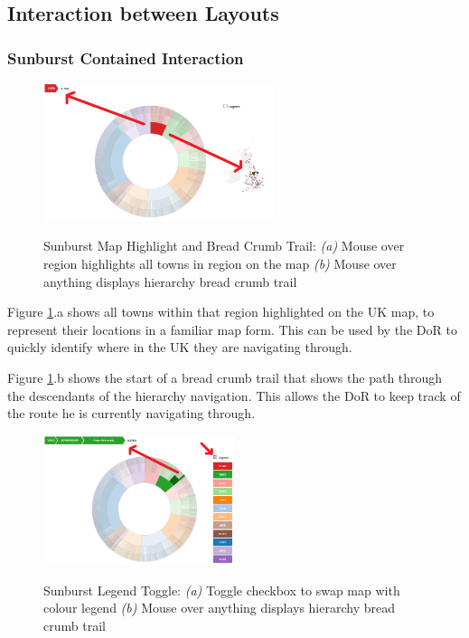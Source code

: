 \documentclass[a4paper, 11pt]{article}
\begin{document}
\newpage
\subsection{Interaction between Layouts}
\subsubsection{Sunburst Contained Interaction}
\begin{figure}[hbt!]
	\centering
      \includegraphics[width=0.6\textwidth]{imgs/sb_int/Region_select.png} \\
	\caption{Sunburst Map Highlight and Bread Crumb Trail: 
	\textit{(a)} Mouse over region highlights all towns in region on the map
	\textit{(b)} Mouse over anything displays hierarchy bread crumb trail}
	\label{fig:sb_con:reg_bread}
          \noindent\makebox[\linewidth]{\rule{\textwidth}{0.4pt}}
\end{figure}

\noindent Figure \ref{fig:sb_con:reg_bread}.a shows all towns within that region highlighted on the UK map, to represent their locations in a familiar map form. This can be used by the DoR to quickly identify where in the UK they are navigating through.

\noindent Figure \ref{fig:sb_con:reg_bread}.b shows the start of a bread crumb trail that shows the path through the descendants of the hierarchy navigation. This allows the DoR to keep track of the route he is currently navigating through.
\\

\begin{figure}[hbt!]
	\centering
      \includegraphics[width=0.5\textwidth]{imgs/sb_int/Legend_Toggle_Bread.png} \\
	\caption{Sunburst Legend Toggle: 
	\textit{(a)} Toggle checkbox to swap map with colour legend
	\textit{(b)} Mouse over anything displays hierarchy bread crumb trail}
    \label{fig:sb_con:legend_toggle_bread}
     \noindent\makebox[\linewidth]{\rule{\textwidth}{0.4pt}}
\end{figure}
\end{document}
